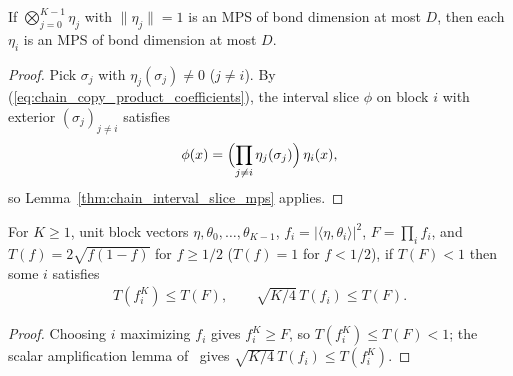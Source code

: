 \begin{lemma}
    \label{thm:chain_copy_product_factor_mps}
    \leanok
    If $\bigotimes_{j=0}^{K-1}\eta_j$ with $\|\eta_j\|=1$ is an MPS of bond
    dimension at most $D$, then each $\eta_i$ is an MPS of bond dimension at
    most $D$.
\end{lemma}
\begin{proof}\leanok
    Pick $\sigma_j$ with $\eta_j(\sigma_j)\ne0$ ($j\ne i$). By
    (\ref{eq:chain_copy_product_coefficients}), the interval slice $\phi$ on
    block $i$ with exterior $(\sigma_j)_{j\ne i}$ satisfies
    \begin{align}
        \label{eq:chain_copy_product_slice}
        \phi(x)=\Bigl(\prod_{j\neq i}\eta_j(\sigma_j)\Bigr)\,\eta_i(x),
    \end{align}
    so Lemma~\ref{thm:chain_interval_slice_mps} applies.
\end{proof}

\begin{lemma}
    \label{thm:chain_copy_error_amplification}
    \leanok
    For $K\ge1$, unit block vectors $\eta,\theta_0,\dots,\theta_{K-1}$,
    $f_i=|\langle\eta,\theta_i\rangle|^2$, $F=\prod_if_i$, and
    $T(f)=2\sqrt{f(1-f)}$ for $f\ge1/2$ ($T(f)=1$ for $f<1/2$), if $T(F)<1$
    then some $i$ satisfies
    \begin{align}
        \label{eq:chain_copy_error_amplification}
        T(f_i^K)\le T(F),\qquad
        \sqrt{K/4}\,T(f_i)\le T(F).
    \end{align}
\end{lemma}
\begin{proof}\leanok
    Choosing $i$ maximizing $f_i$ gives $f_i^K\ge F$, so $T(f_i^K)\le T(F)<1$;
    the scalar amplification lemma of~\cite{QICLean2026Blueprint} gives
    $\sqrt{K/4}\,T(f_i)\le T(f_i^K)$.
\end{proof}

